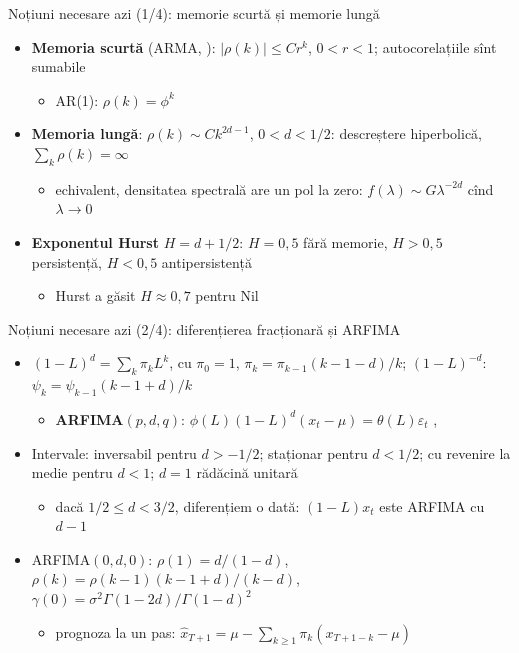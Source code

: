\begin{frame}{Noțiuni necesare azi (1/4): memorie scurtă și memorie lungă}
\itemsize{\small}
\begin{itemize}
    \item \textbf{Memoria scurtă} (ARMA, ): $|\rho(k)| \le Cr^k$, $0 < r < 1$; autocorelațiile sînt sumabile
    \begin{itemize}
        \item AR(1): $\rho(k) = \phi^k$
    \end{itemize}
    \item \textbf{Memoria lungă}: $\rho(k) \sim Ck^{2d-1}$, $0 < d < 1/2$: descreștere hiperbolică, $\sum_k\rho(k) = \infty$
    \begin{itemize}
        \item echivalent, densitatea spectrală are un pol la zero: $f(\lambda) \sim G\lambda^{-2d}$ cînd $\lambda \to 0$
    \end{itemize}
    \item \textbf{Exponentul Hurst} $H = d + 1/2$: $H = 0{,}5$ fără memorie, $H > 0{,}5$ persistență, $H < 0{,}5$ antipersistență
    \begin{itemize}
        \item Hurst a găsit $H \approx 0{,}7$ pentru Nil 
    \end{itemize}
\end{itemize}
\end{frame}

\begin{frame}{Noțiuni necesare azi (2/4): diferențierea fracționară și ARFIMA}
\itemsize{\small}
\begin{itemize}
    \item $(1-L)^d = \sum_k\pi_kL^k$, cu $\pi_0 = 1$, $\pi_k = \pi_{k-1}(k-1-d)/k$; $(1-L)^{-d}$: $\psi_k = \psi_{k-1}(k-1+d)/k$
    \begin{itemize}
        \item \textbf{ARFIMA}$(p,d,q)$: $\phi(L)(1-L)^d(x_t - \mu) = \theta(L)\varepsilon_t$ , 
    \end{itemize}
    \item Intervale: inversabil pentru $d > -1/2$; staționar pentru $d < 1/2$; cu revenire la medie pentru $d < 1$; $d = 1$ rădăcină unitară
    \begin{itemize}
        \item dacă $1/2 \le d < 3/2$, diferențiem o dată: $(1-L)x_t$ este ARFIMA cu $d - 1$
    \end{itemize}
    \item ARFIMA$(0,d,0)$: $\rho(1) = d/(1-d)$, $\rho(k) = \rho(k-1)(k-1+d)/(k-d)$, $\gamma(0) = \sigma^2\Gamma(1-2d)/\Gamma(1-d)^2$
    \begin{itemize}
        \item prognoza la un pas: $\hat x_{T+1} = \mu - \sum_{k\ge1}\pi_k(x_{T+1-k} - \mu)$
    \end{itemize}
\end{itemize}
\end{frame}

